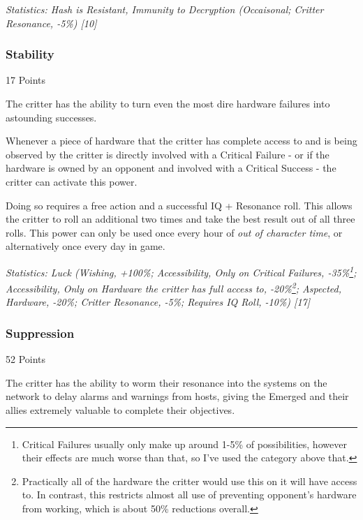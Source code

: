 \begin{multicols*}{3}
	\textcolor{OliveGreen}{\textit{Statistics: Hash is Resistant, Immunity to Decryption (Occaisonal; Critter Resonance, -5\%) [10]}}

	\subsubsection{Stability}\label{stability}
	\begin{flushright}
		17 Points
	\end{flushright}

	The critter has the ability to turn even the most dire hardware failures into astounding successes.
	
	Whenever a piece of hardware that the critter has complete access to and is being observed by the critter is directly involved with a Critical Failure - or if the hardware is owned by an opponent and involved with a Critical Success - the critter can activate this power.
	
	Doing so requires a free action and a successful IQ + Resonance roll. This allows the critter to roll an additional two times and take the best result out of all three rolls. This power can only be used once every hour of \textit{out of character time}, or alternatively once every day in game.

	\textcolor{OliveGreen}{\textit{Statistics: Luck (Wishing, +100\%; Accessibility, Only on Critical Failures, -35\%\footnote{Critical Failures usually only make up around 1-5\% of possibilities, however their effects are much worse than that, so I've used the category above that.}; Accessibility, Only on Hardware the critter has full access to, -20\%\footnote{Practically all of the hardware the critter would use this on it will have access to. In contrast, this restricts almost all use of preventing opponent's hardware from working, which is about 50\% reductions overall.}; Aspected, Hardware, -20\%; Critter Resonance, -5\%; Requires IQ Roll, -10\%) [17] }}

	\subsubsection{Suppression}\label{suppression}
	\begin{flushright}
		52 Points
	\end{flushright}

	The critter has the ability to worm their resonance into the systems on the network to delay alarms and warnings from hosts, giving the Emerged and their allies extremely valuable to complete their objectives.
	

\end{multicols*}
